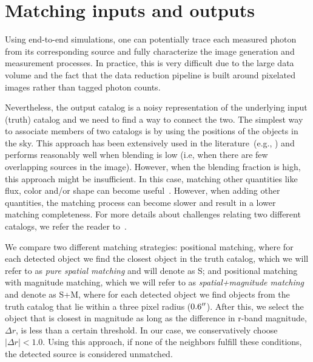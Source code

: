 \documentclass[a4paper,fleqn,usenatbib]{mnras}
\begin{document}
\section{Matching inputs and outputs}
\label{sec:matching}

Using end-to-end simulations, one can potentially trace each measured photon from its corresponding source and fully characterize the image generation and measurement processes. In practice, this is very difficult due to the large data volume and the fact that the data reduction pipeline is built around pixelated images rather than tagged photon counts.

Nevertheless, the output catalog is a noisy representation of the underlying input (truth) catalog and we need to find a way to connect the two. 
The simplest way to associate members of two catalogs is by using the positions of the objects in the sky. This approach has been extensively used in the literature~(e.g., \citealt{1977A&AS...28..211D,1983Obs...103..150B,1986MNRAS.223..279W}) and performs reasonably well when blending is low (i.e, when there are few overlapping sources in the image). However, when the blending fraction is high, this approach might be insufficient. In this case, matching other quantities like flux, color and/or shape can become useful~\citep{2008ApJ...679..301B, doi:10.1146/annurev-statistics-010814-020231}. However, when adding other quantities, the matching process can become slower and result in a lower matching completeness. For more details about challenges relating two different catalogs, we refer the reader to~\citet{doi:10.1146/annurev-statistics-010814-020231}. 

We compare two different matching strategies: positional matching, where for each detected object we find the closest object in the truth catalog, which we will refer to as \textit{pure spatial matching} and will denote as \textsf{S}; and positional matching with magnitude matching, which we will refer to as \textit{spatial+magnitude matching} and denote as \textsf{S+M}, where for each detected object we find objects from the truth catalog that lie within a three pixel radius ($0.6 \hbox{$^{\prime\prime}$}$). After this, we select the object that is closest in magnitude as long as the difference in r-band magnitude, $\Delta r$, is less than a certain threshold. In our case, we conservatively choose $|\Delta r| < 1.0$. Using this approach, if none of the neighbors fulfill these conditions, the detected source is considered unmatched.
\end{document}
